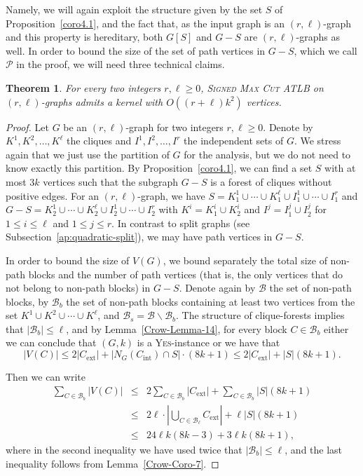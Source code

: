 \documentclass[
final
]{dmtcs-episciences}
\newtheorem{theorem}{Theorem}{\bfseries}{\itshape}
\begin{document}
Namely, we will again exploit the structure given by the set $S$ of Proposition~\ref{coro4.1}, and the fact that, as  the input graph is an $(r,\ell)$-graph and this property is hereditary, both $G[S]$ and $G-S$ are $(r,\ell)$-graphs as well. In order to bound the size of the set of path vertices in $G-S$, which we call $\mathcal{P}$ in the proof, we will need three technical claims.


\begin{theorem}\label{thm:quadratic-general}
For every two integers $r,\ell \geq 0$, \textsc{Signed Max Cut ATLB} on $(r,\ell)$-graphs admits a kernel with $O((r+\ell)k^2)$ vertices.
\end{theorem}
\begin{proof}
Let $G$ be an $(r,\ell)$-graph for two integers $r,\ell \geq 0$. Denote by $K^1,K^2,\ldots,K^\ell$ the cliques and $I^1,I^2,\ldots,I^r$ the independent sets of $G$.  We stress again that we just use the partition of $G$ for the analysis, but we do not need to know exactly this partition.  By Proposition~\ref{coro4.1}, we can find a set $S$ with at most $3k$ vertices such that the subgraph $G-S$ is a forest of cliques without positive edges. For an $(r,\ell)$-graph, we have $S=K^1_1\cup\cdots\cup K^\ell_1\cup I^1_1\cup\cdots\cup I^r_1$ and $G-S=K^1_2\cup\cdots\cup K^\ell_2\cup I^1_2\cup\cdots\cup I^r_2$ with $K^i = K^i_1 \cup K^i_2$ and $I^j = I^j_1 \cup I^j_2$ for $1 \leq i \leq \ell$ and $1 \leq j \leq r$. In contrast to split graphs (see  Subsection~\ref{ap:quadratic-split}), we may have path vertices in $G-S$.

In order to bound the size of $V(G)$, we bound separately the total size of non-path blocks and the number of path vertices (that is, the only vertices that do not belong to non-path blocks) in $G-S$. Denote again by $\mathcal{B}$ the set of non-path blocks, by $\mathcal{B}_b$ the set of non-path blocks containing at least two vertices  from the set $K^1 \cup K^2 \cup \cdots \cup K^\ell$, and $\mathcal{B}_s=\mathcal{B}\backslash\mathcal{B}_b$.
	The structure of clique-forests implies that $|\mathcal{B}_b|\leq \ell$, and by Lemma~\ref{Crow-Lemma-14}, for every block $C\in\mathcal{B}_b$ either we can conclude that $(G,k)$ is a \textsc{Yes}-instance or we have that $$
 |V(C)|\leq 2|C_{\text{ext}}|+|N_{G}(C_{\text{int}})\cap S| \cdot (8k+1)\leq 2|C_{\text{ext}}|+|S|(8k+1).
 $$

Then we can write
\begin{eqnarray*}
\sum_{C\in\mathcal{B}_b}{|V(C)|} & \leq &  2 \sum_{C\in\mathcal{B}_b}{|C_{\text{ext}}|}+\sum_{C\in\mathcal{B}_b}{|S|(8k+1)}\\
 & \leq & 2 \ell  \cdot |\bigcup_{C\in\mathcal{B}_{\ell}}C_{\text{ext}}|+\ell|S|(8k+1) \\
 & \leq & 24 \ell k(8k-3)+3\ell k(8k+1),
\end{eqnarray*}
where in the second inequality we have used twice that $|\mathcal{B}_b|\leq \ell$, and the last inequality follows from Lemma~\ref{Crow-Coro-7}.



\end{proof}
\end{document}
